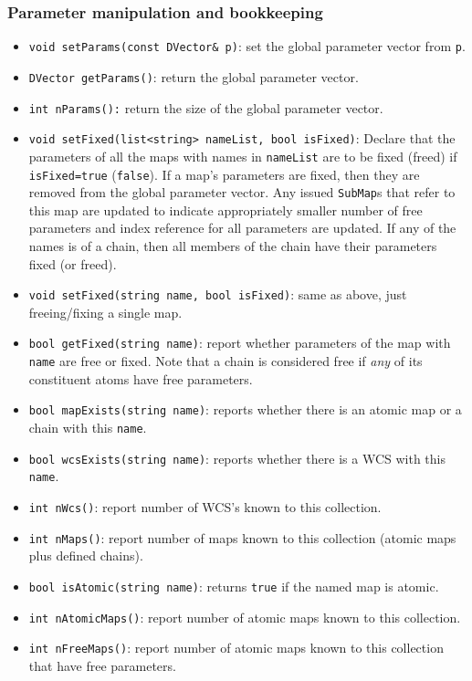 \documentclass[11pt,preprint,flushrt]{aastex}
\begin{document}
\subsubsection{Parameter manipulation and bookkeeping}
\begin{itemize}
\item {\tt  void setParams(const DVector\& p)}: set the global parameter vector from {\tt p}.
\item {\tt  DVector getParams()}: return the global parameter vector.
\item {\tt  int nParams():} return the size of the global parameter vector.
\item {\tt void setFixed(list<string> nameList, bool isFixed)}: Declare that the parameters of all the maps with names in {\tt nameList} are to be fixed (freed) if {\tt isFixed=true} ({\tt false}).  If a map's parameters are fixed, then they are removed from the global parameter vector.  Any issued {\tt SubMap}s that refer to this map are updated to indicate appropriately smaller number of free parameters and index reference for all parameters are updated.  If any of the names is of a chain, then all members of the chain have their parameters fixed (or freed).
\item {\tt void setFixed(string name, bool isFixed)}: same as above, just freeing/fixing a single map.
\item {\tt bool getFixed(string name)}: report whether parameters of the map with {\tt name} are free or fixed.  Note that a chain is considered free if \emph{any} of its constituent atoms have free parameters.
\item {\tt bool mapExists(string name)}: reports whether there is an atomic map or a chain with this {\tt name}.
\item {\tt bool wcsExists(string name)}: reports whether there is a WCS with this {\tt name}.
\item {\tt int nWcs()}: report number of WCS's known to this collection.
\item {\tt int nMaps()}: report number of maps known to this collection (atomic maps plus defined chains).
\item {\tt bool isAtomic(string name)}: returns \texttt{true} if the named map is atomic.
\item {\tt int nAtomicMaps()}: report number of atomic maps known to this collection.
\item {\tt int nFreeMaps()}: report number of atomic maps known to this collection that have free parameters.
\end{itemize}
\end{document}
